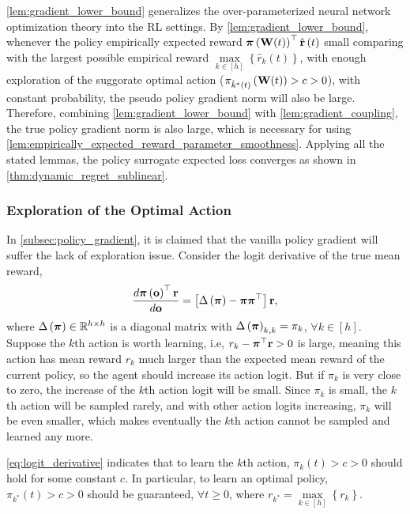 \cref{lem:gradient_lower_bound} generalizes the over-parameterized neural network optimization theory into the RL settings. By \cref{lem:gradient_lower_bound}, whenever the policy empirically expected reward ${\boldsymbol{\pi}}\left( {\mathbf{W}}(t) \right)^\top \hat{{\mathbf{r}}}\left(t\right)$ small comparing with the largest possible empirical reward $\max\limits_{k \in \left[h\right]}\left\{ \hat{r}_k\left(t\right) \right\}$, with enough exploration of the suggorate optimal action ($\pi_{\hat{k}^*(t)}\left({\mathbf{W}}(t)\right) > c > 0$), with constant probability, the pseudo policy gradient norm will also be large. Therefore, combining \cref{lem:gradient_lower_bound} with \cref{lem:gradient_coupling}, the true policy gradient norm is also large, which is necessary for using \cref{lem:empirically_expected_reward_parameter_smoothness}. Applying all the stated lemmas, the policy surrogate expected loss converges as shown in \cref{thm:dynamic_regret_sublinear}.

\subsubsection{Exploration of the Optimal Action}
\label{subsubsec:exploration_in_policy_learning}

In \cref{subsec:policy_gradient}, it is claimed that the vanilla policy gradient will suffer the lack of exploration issue. Consider the logit derivative of the true mean reward,
\begin{equation}
\label{eq:logit_derivative}
\begin{split}
    \frac{d {\boldsymbol{\pi}}\left( {\mathbf{o}} \right)^\top {\mathbf{r}}}{d {\mathbf{o}}} = \left[ \Delta\left( {\boldsymbol{\pi}} \right) - {\boldsymbol{\pi}} {\boldsymbol{\pi}}^\top \right] {\mathbf{r}},
\end{split}
\end{equation}
where $\Delta\left( {\boldsymbol{\pi}} \right) \in {\mathbb{R}}^{h \times h}$ is a diagonal matrix with $\Delta\left( {\boldsymbol{\pi}} \right)_{k,k} = \pi_{k}$, $\forall k \in [h]$. Suppose the $k$th action is worth learning, i.e, $r_k - {\boldsymbol{\pi}}^\top {\mathbf{r}} > 0$ is large, meaning this action has mean reward $r_k$ much larger than the expected mean reward of the current policy, so the agent should increase its action logit. But if $\pi_{k}$ is very close to zero, the increase of the $k$th action logit will be small. Since $\pi_{k}$ is small, the $k$th action will be sampled rarely, and with other action logits increasing, $\pi_{k}$ will be even smaller, which makes eventually the $k$th action cannot be sampled and learned any more.

\cref{eq:logit_derivative} indicates that to learn the $k$th action, $\pi_{k}\left(t\right) > c > 0$ should hold for some constant $c$. In particular, to learn an optimal policy, $\pi_{k^*}(t) > c > 0$ should be guaranteed, $\forall t \ge 0$, where $r_{k^*} = \max\limits_{k \in \left[ h \right]}\left\{ r_k \right\}$.

